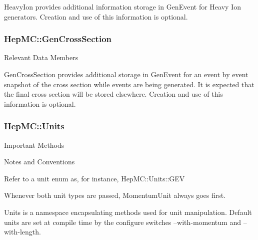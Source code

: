 \documentclass[11pt,letterpaper]{article}
\begin{document}
HeavyIon provides additional information storage in GenEvent for Heavy Ion
generators.  Creation and use of this information is optional. 


%
%

\subsubsection{HepMC::GenCrossSection}
\begin{myitemize}{Relevant Data Members}
\end{myitemize}

GenCrossSection provides additional storage in GenEvent for an event by event 
snapshot of the cross section while events are being generated.
It is expected that the final cross section will be stored elsewhere.
Creation and use of this information is optional. 

%
%

\subsubsection{HepMC::Units}
\begin{myitemize}{Important Methods}
\end{myitemize}
\begin{myitemize}{Notes and Conventions}
  \item Refer to a unit enum as, for instance, HepMC::Units::GEV
  \item Whenever both unit types are passed, MomentumUnit always goes first.
\end{myitemize}

Units is a namespace encapsulating methods used for unit manipulation.
Default units are set at compile time by the configure switches
--with-momentum and --with-length.  

%
%
\end{document}
